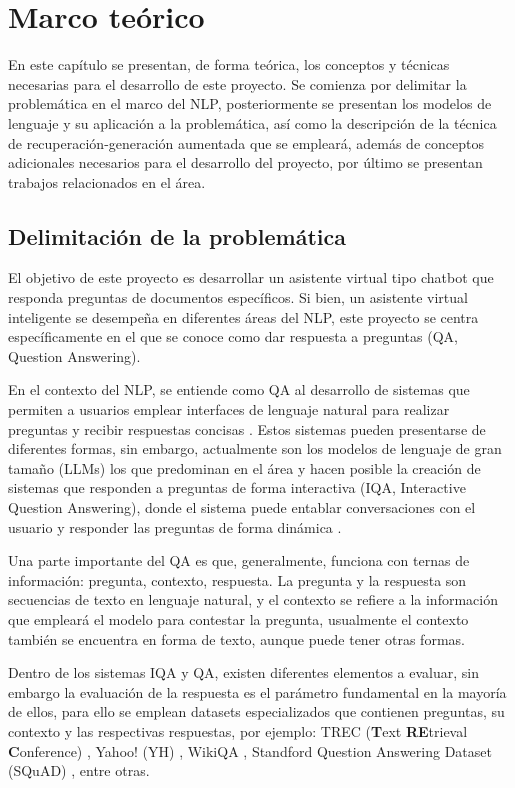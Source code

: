 \chapter{Marco teórico}

En este capítulo se presentan, de forma teórica, los conceptos y técnicas
necesarias para el desarrollo de este proyecto. Se comienza por delimitar
la problemática en el marco del NLP, posteriormente se presentan los
modelos de lenguaje y su aplicación a la problemática, así como la
descripción de la técnica de recuperación-generación aumentada que se empleará,
además de conceptos adicionales necesarios para el desarrollo del proyecto,
por último se presentan trabajos relacionados en el área.

\section{Delimitación de la problemática}

El objetivo de este proyecto es desarrollar un asistente virtual tipo chatbot
que responda preguntas de documentos específicos. Si bien, un asistente
virtual inteligente se desempeña en diferentes áreas del NLP, este proyecto
se centra específicamente en el que se conoce como dar respuesta a preguntas
(QA, Question Answering).

En el contexto del NLP, se entiende como QA al desarrollo de sistemas que
permiten a usuarios emplear interfaces de lenguaje natural para realizar
preguntas y recibir respuestas concisas \cite{pereira_systematic_2022}.
Estos sistemas pueden presentarse de diferentes formas, sin embargo,
actualmente son los modelos de lenguaje de gran tamaño (LLMs) los que
predominan en el área y hacen posible la creación de sistemas que responden
a preguntas de forma interactiva (IQA, Interactive Question Answering),
donde el sistema puede entablar conversaciones con el usuario y responder
las preguntas de forma dinámica \cite{biancofiore_interactive_2024}.

Una parte importante del QA es que, generalmente, funciona con ternas de
información: pregunta, contexto, respuesta. La pregunta y la respuesta
son secuencias de texto en lenguaje natural, y el contexto se refiere a
la información que empleará el modelo para contestar la pregunta, usualmente
el contexto también se encuentra en forma de texto, aunque puede tener
otras formas.

Dentro de los sistemas IQA y QA, existen diferentes elementos a evaluar,
sin embargo la evaluación de la respuesta es el parámetro fundamental en la
mayoría de ellos, para ello se emplean datasets especializados que contienen
preguntas, su contexto y las respectivas respuestas, por ejemplo:
TREC (\textbf{T}ext \textbf{RE}trieval \textbf{C}onference)
\cite{noauthor_proceedings_2001}, Yahoo! (YH) \cite{zhou_learning_2016},
WikiQA \cite{yang_wikiqa_2015}, Standford Question Answering Dataset (SQuAD)
\cite{rajpurkar_squad_2016}, entre otras.


